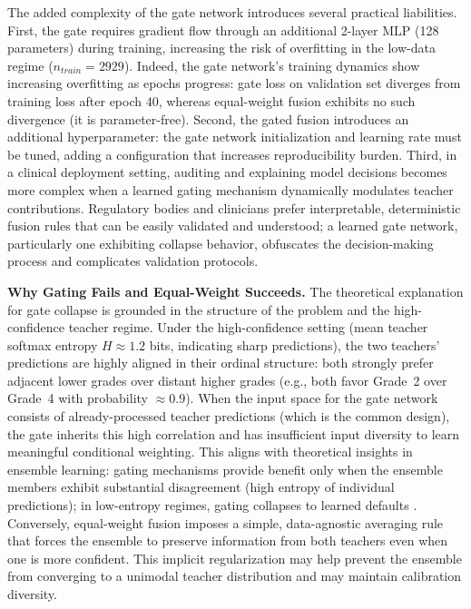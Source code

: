 \documentclass[a4paper,fleqn]{cas-dc}
\begin{document}
The added complexity of the gate network introduces several practical liabilities. First, the gate requires gradient flow through an additional 2-layer MLP (128 parameters) during training, increasing the risk of overfitting in the low-data regime ($n_{train} = 2929$). Indeed, the gate network's training dynamics show increasing overfitting as epochs progress: gate loss on validation set diverges from training loss after epoch 40, whereas equal-weight fusion exhibits no such divergence (it is parameter-free). Second, the gated fusion introduces an additional hyperparameter: the gate network initialization and learning rate must be tuned, adding a configuration that increases reproducibility burden. Third, in a clinical deployment setting, auditing and explaining model decisions becomes more complex when a learned gating mechanism dynamically modulates teacher contributions. Regulatory bodies and clinicians prefer interpretable, deterministic fusion rules that can be easily validated and understood; a learned gate network, particularly one exhibiting collapse behavior, obfuscates the decision-making process and complicates validation protocols.

\textbf{Why Gating Fails and Equal-Weight Succeeds.} The theoretical explanation for gate collapse is grounded in the structure of the problem and the high-confidence teacher regime. Under the high-confidence setting (mean teacher softmax entropy $H \approx 1.2$ bits, indicating sharp predictions), the two teachers' predictions are highly aligned in their ordinal structure: both strongly prefer adjacent lower grades over distant higher grades (e.g., both favor Grade~2 over Grade~4 with probability $\approx 0.9$). When the input space for the gate network consists of already-processed teacher predictions (which is the common design), the gate inherits this high correlation and has insufficient input diversity to learn meaningful conditional weighting. This aligns with theoretical insights in ensemble learning: gating mechanisms provide benefit only when the ensemble members exhibit substantial disagreement (high entropy of individual predictions); in low-entropy regimes, gating collapses to learned defaults \cite{zhou2012,kuncheva2014}. Conversely, equal-weight fusion imposes a simple, data-agnostic averaging rule that forces the ensemble to preserve information from both teachers even when one is more confident. This implicit regularization may help prevent the ensemble from converging to a unimodal teacher distribution and may maintain calibration diversity.
\end{document}

